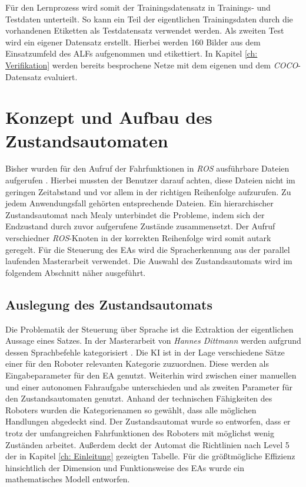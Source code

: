 		Für den Lernprozess wird somit der Trainingsdatensatz in Trainings- und Testdaten unterteilt. So kann ein Teil der eigentlichen Trainingsdaten durch die vorhandenen Etiketten als Testdatensatz verwendet werden. Als zweiten Test wird ein eigener Datensatz erstellt. Hierbei werden 160 Bilder aus dem Einsatzumfeld des ALFs aufgenommen und etikettiert. In Kapitel \ref{ch: Verifikation} werden bereits besprochene Netze mit dem eigenen und dem \textit{COCO}-Datensatz evaluiert.
		
	\section{Konzept und Aufbau des Zustandsautomaten}
	\label{sec: Umsetzung der Statemachine}
	Bisher wurden für den Aufruf der Fahrfunktionen in \textit{ROS} ausführbare Dateien aufgerufen \cite{Bachelorarbeit}. Hierbei mussten der Benutzer darauf achten, diese Dateien nicht im geringen Zeitabstand und vor allem in der richtigen Reihenfolge aufzurufen. Zu jedem Anwendungsfall gehörten entsprechende Dateien. Ein hierarchischer Zustandsautomat nach Mealy unterbindet die Probleme, indem sich der Endzustand durch zuvor aufgerufene Zustände zusammensetzt. Der Aufruf verschiedner \textit{ROS}-Knoten in der korrekten Reihenfolge wird somit autark geregelt. Für die Steuerung des EAs wird die Spracherkennung aus der parallel laufenden Masterarbeit verwendet. Die Auswahl des Zustandsautomats wird im folgendem Abschnitt näher ausgeführt.\\	
	
	\subsection{Auslegung des Zustandsautomats}
	Die Problematik der Steuerung über Sprache ist die Extraktion der eigentlichen Aussage eines Satzes. In der Masterarbeit von \textit{Hannes Dittmann} werden aufgrund dessen Sprachbefehle kategorisiert \cite{Dittmann}. Die KI ist in der Lage verschiedene Sätze einer für den Roboter relevanten Kategorie zuzuordnen. Diese werden als Eingabeparameter für den EA genutzt. Weiterhin wird zwischen einer manuellen und einer autonomen Fahraufgabe unterschieden und als zweiten Parameter für den Zustandsautomaten genutzt. Anhand der technischen Fähigkeiten des Roboters wurden die Kategorienamen so gewählt, dass alle möglichen Handlungen abgedeckt sind. Der Zustandsautomat wurde so entworfen, dass er trotz der umfangreichen Fahrfunktionen des Roboters mit möglichst wenig Zuständen arbeitet. Außerdem deckt der Automat die Richtlinien nach Level 5 der in Kapitel \ref{ch: Einleitung} gezeigten Tabelle. Für die größtmögliche Effizienz hinsichtlich der Dimension und Funktionsweise des EAs wurde ein mathematisches Modell entworfen.\\
	
